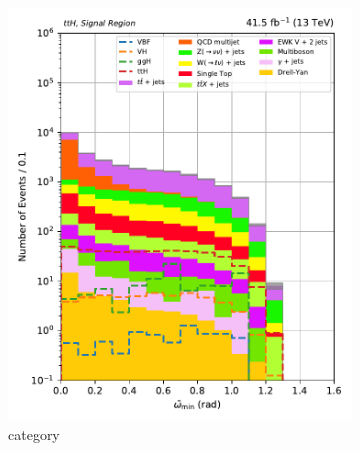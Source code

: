 \begin{figure}[htbp]
    \centering
    \begin{subfigure}[b]{0.35\textwidth}
        \includegraphics[width=\textwidth]{figures/category_optimisations/with_mindphi_cut/min_omega_tilde_ttH.pdf}
        \caption{\ttH category}
    \end{subfigure}
    \hspace{0.1\textwidth}
    \begin{subfigure}[b]{0.35\textwidth}

\end{subfigure}
\end{figure}
